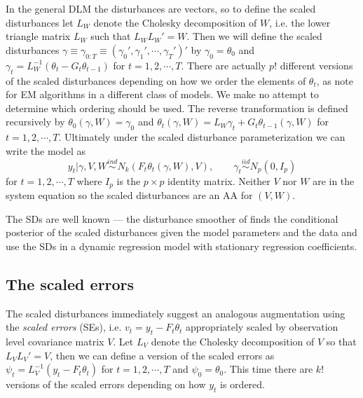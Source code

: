 \documentclass[12pt]{article}
\newcommand{\matt}[1]{{\color{red} Matt: #1}}
\begin{document}
In the general DLM the disturbances are vectors, so to define the scaled disturbances let $L_W$ denote the Cholesky decomposition of $W$, i.e. the lower triangle matrix $L_W$ such that $L_WL_W' =W$. Then we will define the scaled disturbances $\gamma\equiv\gamma_{0:T}\equiv(\gamma_0',\gamma_1',\cdots,\gamma_T')'$ by $\gamma_0=\theta_0$ and $\gamma_t = L_W^{-1}(\theta_t-G_t\theta_{t-1})$ for $t=1,2,\cdots,T$. There are actually $p!$ different versions of the scaled disturbances depending on how we order the elements of $\theta_t$, as \citet{meng1998fast} note for EM algorithms in a different class of models. We make no attempt to determine which ordering should be used.
The reverse transformation is defined recursively by $\theta_0(\gamma,W)=\gamma_0$ and $\theta_t(\gamma,W)=L_W\gamma_t + G_t\theta_{t-1}(\gamma,W)$ for $t=1,2,\cdots,T$. Ultimately under the scaled disturbance parameterization we can write the model as
\begin{equation}
  y_t|\gamma,V,W  \stackrel{ind}{\sim} N_k\left(F_t\theta_t(\gamma,W), V\right), \qquad
  \gamma_t  \stackrel{iid}{\sim}N_p(0,I_p) \label{dlmdistmodel}
\end{equation}
for $t=1,2,\cdots,T$ where $I_p$ is the $p\times p$ identity matrix. Neither $V$ nor $W$ are in the system equation so the scaled disturbances are an AA for $(V,W)$.

The SDs are well known --- the disturbance smoother of \citet{koopman1993disturbance} finds the conditional posterior of the scaled disturbances given the model parameters and the data and \citet{fruhwirth2004efficient} use the SDs in a dynamic regression model with stationary regression coefficients.

\subsection{The scaled errors}\label{sec:DAs:error}
The scaled disturbances immediately suggest an analogous augmentation using the {\it scaled errors} (SEs), i.e. $v_t=y_t - F_t\theta_t$ appropriately scaled by observation level covariance matrix $V$. Let $L_V$ denote the Cholesky decomposition of $V$ so that $L_VL_V'=V$, then we can define a version of the scaled errors as $\psi_t = L_V^{-1}(y_t - F_t\theta_t)$ for $t=1,2,\cdots,T$ and $\psi_0 = \theta_0$. This time there are $k!$ versions of the scaled errors depending on how $y_t$ is ordered.
\end{document}
